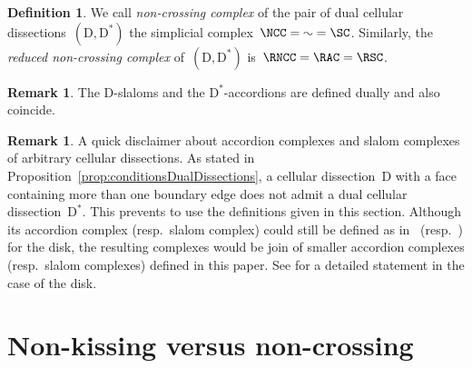\documentclass{amsart}
\theoremstyle{definition}
\newtheorem{definition}[theorem]{Definition}
\newtheorem{remark}[theorem]{Remark}
\newcommand{\darkblue}{\color{darkblue}} %
\newcommand{\defn}[1]{\textsl{\darkblue #1}} %
\newcommand{\dual}{^*} %
\newcommand{\dissection}{\mathrm{D}} %
\begin{document}
\begin{definition}
\label{def:noncrossingComplex}
We call \defn{non-crossing complex} of the pair of dual cellular dissections~$(\dissection, \dissection\dual)$ the simplicial complex~$\NCC = \AC = \SC$.
Similarly, the \defn{reduced non-crossing complex} of~$(\dissection, \dissection\dual)$ is~$\RNCC = \RAC = \RSC$.
\end{definition}


\begin{remark}
The $\dissection$-slaloms and the $\dissection\dual$-accordions are defined dually and also coincide.
\end{remark}

\begin{remark}
A quick disclaimer about accordion complexes and slalom complexes of arbitrary cellular dissections.
As stated in Proposition~\ref{prop:conditionsDualDissections}, a cellular dissection~$\dissection$ with a face containing more than one boundary edge does not admit a dual cellular dissection~$\dissection\dual$.
This prevents to use the definitions given in this section.
Although its accordion complex (resp.~slalom complex) could still be defined as in~\cite{MannevillePilaud-accordion} (resp.~\cite{GarverMcConville}) for the disk, the resulting complexes would be join of smaller accordion complexes (resp.~slalom complexes) defined in this paper.
See \cite[Prop.~2.4]{MannevillePilaud-accordion} for a detailed statement in the case of the disk.
\end{remark}

\section{Non-kissing versus non-crossing}
\end{document}
